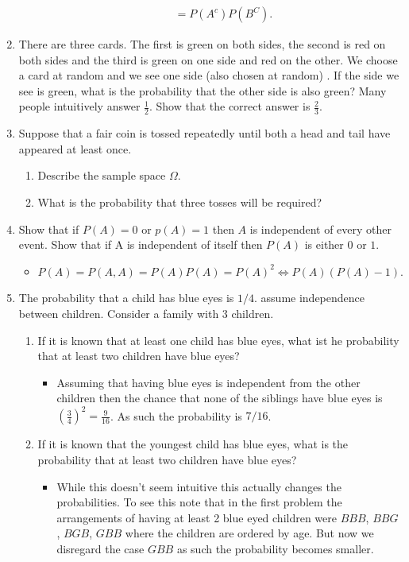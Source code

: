 \documentclass{article}
\begin{document}
\begin{enumerate}
\begin{itemize}
$$\begin{aligned}
			&= P(A^c)P(B^C).
			\end{aligned}
			$$
		\end{itemize}
	\item There are three cards. The first is green on both sides, the second is red on both sides and the third is green on one side and red on the other. We choose a card at random and we see one side (also chosen at random) . If the side we see is green, what is the probability that the other side is also green? Many people intuitively answer $\frac{1}{2}$. Show that the correct answer is $\frac{2}{3}$.
	\item Suppose that a fair coin is tossed repeatedly until both a head and tail have appeared at least once.
		\begin{enumerate}
			\item Describe the sample space $\Omega$.
			\item What is the probability that three tosses will be required?
		\end{enumerate}
	\item Show that if $P(A) = 0$ or $p(A) = 1$ then $A$ is independent of every other event. Show that if A is independent of itself then $P(A)$ is either $0$ or $1$.
		\begin{itemize}
			\item $P(A) = P(A, A) = P(A)P(A) = P(A)^2 \iff P(A)(P(A) - 1).$
		\end{itemize}
	\item The probability that a child has blue eyes is $1 / 4$. assume independence between children. Consider a family with $3$ children.
		\begin{enumerate}
			\item If it is known that at least one child has blue eyes, what ist he probability that at least two children have blue eyes?
				\begin{itemize}
					\item Assuming that having blue eyes is independent from the other children then the chance that none of the siblings have blue eyes is $\left(\frac{3}{4}\right)^2 = \frac{9}{16}$. As such the probability is $7 / 16$. 
				\end{itemize}
			\item If it is known that the youngest child has blue eyes, what is the probability that at least two children have blue eyes?
				\begin{itemize}
					\item While this doesn't seem intuitive this actually changes the probabilities. To see this note that in the first problem the arrangements of having at least 2 blue eyed children were $BBB$, $BBG$, $BGB$, $GBB$ where the children are ordered by age. But now we disregard the case $GBB$ as such the probability becomes smaller.

\end{itemize}
\end{enumerate}
\end{enumerate}
\end{document}
